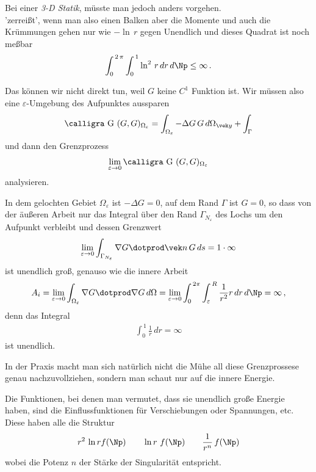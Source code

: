 {{{{Bei einer {\em 3-D Statik\/}, m\"{u}sste man jedoch anders vorgehen.\\

'zerrei{\ss}t', wenn man also einen Balken
aber die Momente und auch die Kr\"{u}mmungen gehen nur wie $-\ln\,r$ gegen Unendlich und dieses Quadrat ist noch me{\ss}bar
\begin{align}
\int_0^{\,2\,\pi} \int_0^{\,1} \ln^2\,r\,dr\,d\Np \leq \infty\,.
\end{align}

Das k\"{o}nnen wir nicht direkt tun, weil $G$ keine $C^1$ Funktion ist. Wir m\"{u}ssen also eine $\varepsilon$-Umgebung des Aufpunktes aussparen
\begin{align}
\text{\normalfont\calligra G\,\,}(G, G)_{\Omega_\varepsilon} = \int_{\Omega_\varepsilon} - \Delta G\,G\,d\Omega_{\vek y} + \int_{\Gamma}
\end{align}
und dann den Grenzprozess
\begin{align}
\lim_{\varepsilon \to 0} \text{\normalfont\calligra G\,\,}(G, G)_{\Omega_\varepsilon}
\end{align}
analysieren.

In dem gelochten Gebiet $\Omega_\varepsilon$ ist $- \Delta G = 0$, auf dem Rand $\Gamma$ ist $G = 0$, so dass von der \"{a}u{\ss}eren Arbeit nur das Integral \"{u}ber den Rand $\Gamma_{N_\varepsilon}$ des Lochs um den Aufpunkt verbleibt und dessen Grenzwert
\begin{align}
\lim_{\varepsilon \to 0} \int_{\Gamma_{N_\varepsilon}} \nabla G \dotprod  \vek n \,G\,ds = 1 \cdot \infty
\end{align}
ist unendlich gro{\ss}, genauso wie die innere Arbeit
\begin{align}
A_i = \lim_{\varepsilon \to 0} \int_{\Omega_\varepsilon } \nabla G \dotprod  \nabla G \,d\Omega = \lim_{\varepsilon \to 0}\int_0^{\,2 \pi} \int_\varepsilon^{\,R} \frac{1}{r^2} r\,dr\,d\Np = \infty\,,
\end{align}
denn das Integral
\begin{align}
\int_0^{\,1} \frac{1}{r}\,dr = \infty
\end{align}
ist unendlich.

In der Praxis macht man sich nat\"{u}rlich nicht die M\"{u}he all diese Grenzprossese genau nachzuvollziehen, sondern man schaut nur auf die innere Energie.

Die Funktionen, bei denen man vermutet, dass sie unendlich gro{\ss}e Energie haben, sind die Einflussfunktionen f\"{u}r Verschiebungen oder Spannungen, etc. Diese haben alle die Struktur
\begin{align}
r^2\,\ln r f(\Np)\qquad \ln r\,\,f(\Np) \qquad \frac{1}{r^n}\,f(\Np)
\end{align}
wobei die Potenz $n$ der St\"{a}rke der Singularit\"{a}t entspricht.\\

}}}}
